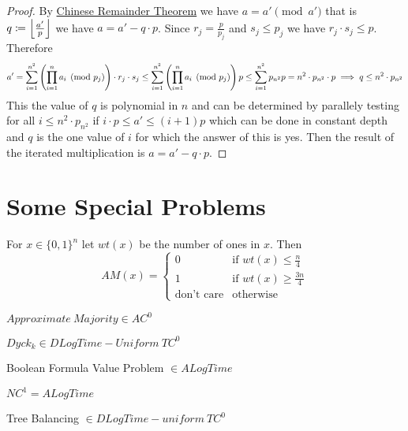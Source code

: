 \begin{proof}
	By \hyperref[crt]{Chinese Remainder Theorem} we have $a=a'\pmod{a'}$ that is $q\coloneqq \left\lfloor \frac{a'}{p}\right\rfloor$ we have $a=a'-q\cdot p$. Since $r_j=\frac{p}{p_j}$ and $s_j\leq p_j$ we have $r_j\cdot s_j\leq p$. Therefore $$a'= \sum_{i=1}^{n^2}\left( \prod\limits_{i=1}^n a_i\pmod{p_j} \right)\cdot r_j\cdot s_j\leq  \sum_{i=1}^{n^2}\left( \prod\limits_{i=1}^n a_i\pmod{p_j} \right)p\leq  \sum_{i=1}^{n^2}p_{n^2}p=n^2\cdot p_{n^2}\cdot p\implies q\leq n^2\cdot p_{n^2}$$ This the value of $q$ is  polynomial in $n$ and can be determined by parallely testing for all $i\leq n^2\cdot p_{n^2}$ if $i\cdot p\leq a'\leq (i+1)p$ which can be done in constant depth and $q$ is the one value of $i$ for which the answer of this is yes. Then the result of the iterated multiplication is $a=a'-q\cdot p$.
\end{proof}
\section{Some Special Problems}
\begin{definition}
	For $x\in \{0,1\}^n$ let $wt(x)$ be the number of ones in $x$.  Then $$AM(x)=\begin{cases}
		0                 & \text{if } wt(x)\leq \frac{n}{4} \\
		1                 & \text{if } wt(x)\geq \frac{3n}4  \\
		\text{don't care} & \text{otherwise}
	\end{cases}$$
\end{definition}
\begin{theorem}{\cite[Section 4]{AJTAIapproximatemaj}}
	$Approximate\ Majority\in AC^0$
\end{theorem}

\begin{theorem}{\cite[Theorem 2.1, Corollary 2.2]{barringtoncorebettdyckk}}
	$Dyck_k\in DLogTime-Uniform\ TC^0$
\end{theorem}

\begin{theorem}{\cite{formulavalprob}}
	Boolean Formula Value Problem $\in ALogTime$
\end{theorem}
\begin{corollary}
	$NC^1=ALogTime$
\end{corollary}
\begin{theorem}{\cite{ganradilohrey}}
	Tree Balancing $\in DLogTime-uniform\ TC^0$
\end{theorem}